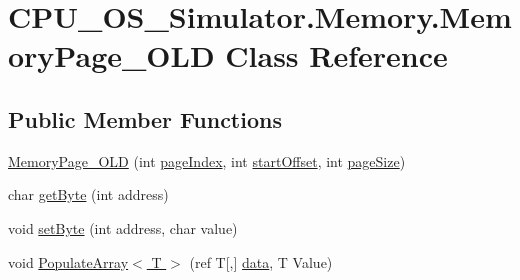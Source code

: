 \hypertarget{class_c_p_u___o_s___simulator_1_1_memory_1_1_memory_page___o_l_d}{}\section{C\+P\+U\+\_\+\+O\+S\+\_\+\+Simulator.\+Memory.\+Memory\+Page\+\_\+\+O\+L\+D Class Reference}
\label{class_c_p_u___o_s___simulator_1_1_memory_1_1_memory_page___o_l_d}
\subsection*{Public Member Functions}
\begin{DoxyCompactItemize}
\item 
\hyperlink{class_c_p_u___o_s___simulator_1_1_memory_1_1_memory_page___o_l_d_a8bcba1ca981b4fd6c04dbdf9422b072b}{Memory\+Page\+\_\+\+O\+L\+D} (int \hyperlink{class_c_p_u___o_s___simulator_1_1_memory_1_1_memory_page___o_l_d_a378522c3baf4d7cf4a7eaa8c164d3de8}{page\+Index}, int \hyperlink{class_c_p_u___o_s___simulator_1_1_memory_1_1_memory_page___o_l_d_a9114e60bd23b6a77765e73520fb5ddc1}{start\+Offset}, int \hyperlink{class_c_p_u___o_s___simulator_1_1_memory_1_1_memory_page___o_l_d_afb00546c1b356df209e380cf9b1b25d2}{page\+Size})
\item 
char \hyperlink{class_c_p_u___o_s___simulator_1_1_memory_1_1_memory_page___o_l_d_ad1259ac2ae7957ab4fd99e847ace40a6}{get\+Byte} (int address)
\item 
void \hyperlink{class_c_p_u___o_s___simulator_1_1_memory_1_1_memory_page___o_l_d_a00f0207abb0f969a24765c7a38aab574}{set\+Byte} (int address, char value)
\item 
void \hyperlink{class_c_p_u___o_s___simulator_1_1_memory_1_1_memory_page___o_l_d_a892ba24ecfb3feb81aa2fe2e9304b8fb}{Populate\+Array$<$ T $>$} (ref T\mbox{[},\mbox{]} \hyperlink{class_c_p_u___o_s___simulator_1_1_memory_1_1_memory_page___o_l_d_a0de587e2918454bff3fdb5cb30c67d49}{data}, T Value)
\end{DoxyCompactItemize}
